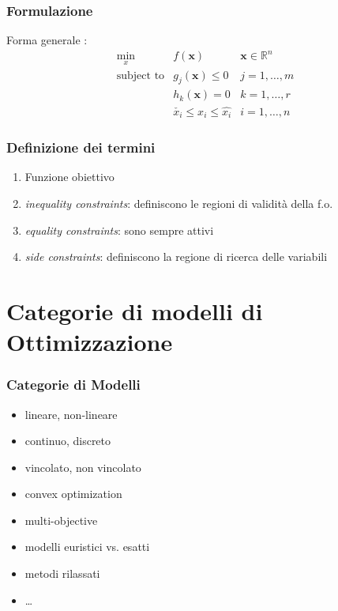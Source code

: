 \documentclass{beamer}
\begin{document}
\begin{frame}
\frametitle{Formulazione}
 Forma generale \cite{vanderplaats1984numerical}:
	\begin{eqnarray}
	\underset{x}{\text{min}} & f(\mathbf{x}) & \mathbf{x} \in \mathbb{R}^n \\
	\text{subject to} & g_j(\mathbf{x}) \leq 0 & j=1,\ldots, m \\
	& h_k(\mathbf{x}) = 0 & k=1,\ldots, r \\
	&  \check{x_i} \leq x_i \leq \hat{x_i}  & i=1,\ldots, n
	\end{eqnarray}
\end{frame}


\begin{frame}
	\frametitle{Definizione dei termini}
	\begin{enumerate}
		\item Funzione obiettivo
		\item \textit{inequality constraints}: definiscono le regioni di validit\`{a} della f.o.
		\item \textit{equality constraints}: sono sempre attivi
		\item \textit{side constraints}: definiscono la regione di ricerca delle variabili
	\end{enumerate}
\end{frame}



\section{Categorie di modelli di Ottimizzazione}


\begin{frame}
	\frametitle{Categorie di Modelli}
	\begin{itemize}
		\item lineare, non-lineare \cite{vanderbei2014linear}
		\item continuo, discreto
		\item vincolato, non vincolato 
		\item convex optimization \cite{boyd2004convex}
		\item multi-objective \cite{desideri2010}
		\item modelli euristici vs. esatti
		\item metodi rilassati
		\item \ldots
	\end{itemize}
\end{frame}
\end{document}
